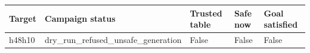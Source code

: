 {\small
\begin{tabular}{lllll}
\hline
Target & Campaign status & Trusted table & Safe now & Goal satisfied \\
\hline
h48h10 & dry\_run\_refused\_unsafe\_generation & False & False & False \\
\hline
\end{tabular}
}
